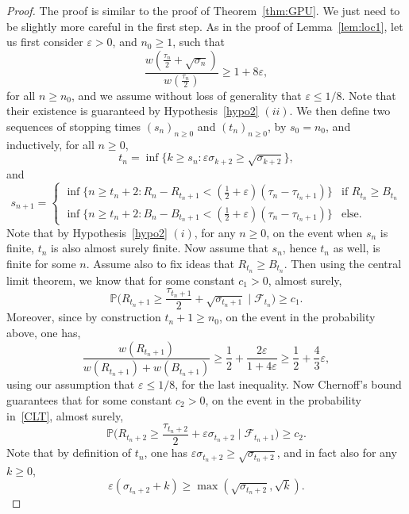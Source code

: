 \documentclass[10pt,a4paper]{amsart}
\newcommand{\1}{{\text{\Large $\mathfrak 1$}}}
\begin{document}
\begin{proof}
The proof is similar to the proof of Theorem~\ref{thm:GPU}. We just need to be slightly more careful in the first step. As in the proof of Lemma~\ref{lem:loc1}, let us first 
consider $\varepsilon>0$, and $n_0\ge 1$, such that 
$$\frac{w( \frac{\tau_n}{2} + \sqrt{\sigma_n})}{w(\frac{\tau_n}{2})} \ge 1+ 8 \varepsilon, $$
for all $n\ge n_0$, and we assume without loss of generality that $\varepsilon\le 1/8$. Note that their existence is guaranteed by Hypothesis~\ref{hypo2} $(ii)$.  We then define two sequences of stopping times $(s_n)_{n\ge 0}$ and 
$(t_n)_{n\ge 0}$, by $s_0 = n_0$, and inductively, for all $n\ge 0$, 
$$t_n = \inf \{ k \ge s_n : \varepsilon\sigma_{k+2} \ge \sqrt{\sigma_{k+2}}\}, $$
and 
\begin{equation*}
s_{n+1} = \left\{ 
\begin{array}{ll} 
\inf \{n \ge t_n +2: R_n - R_{t_n+1} <(\frac 12 + \varepsilon)(\tau_n- \tau_{t_n+1}) \} & \text{if }R_{t_n} \ge B_{t_n} \\
\inf \{n \ge t_n +2: B_n - B_{t_n+1} <(\frac 12 + \varepsilon)(\tau_n- \tau_{t_n+1})\} & \text{else}. 
\end{array}
\right. 
\end{equation*}
Note that by Hypothesis~\ref{hypo2} $(i)$, for any $n\ge 0$, on the event when $s_n$ is finite, $t_n$ is also almost surely finite. 
Now assume that $s_n$, hence $t_n$ as well, is finite for some $n$. Assume also to fix ideas that $R_{t_n} \ge B_{t_n}$. Then using the central limit theorem, we know that for some constant $c_1>0$, almost surely, 
\begin{equation}\label{CLT}
\mathbb P\big(R_{t_n +1} \ge \frac{\tau_{t_n+1}}{2} + \sqrt{\sigma_{t_n +1}} \mid \mathcal F_{t_n}\big)\ge c_1. 
\end{equation}
Moreover, since by construction $t_n+1\ge n_0$, on the event in the probability above, one has, 
$$\frac{w(R_{t_n+1})}{w(R_{t_n+1}) + w(B_{t_n+1})} \ge \frac 12 + \frac{2 \varepsilon}{1+ 4\varepsilon}\ge \frac 12 + \frac 43 \varepsilon,$$
using our assumption that $\varepsilon\le 1/8$, for the last inequality. Now Chernoff's bound guarantees that for some constant $c_2>0$, on the event in the probability in~\eqref{CLT}, almost surely, 
$$ \mathbb P\big(R_{t_n +2} \ge \frac{\tau_{t_n+2}}{2} + \varepsilon \sigma_{t_n+2}  \mid \mathcal F_{t_n+1}\big)\ge c_2.$$  
Note that by definition of $t_n$, one has $\varepsilon \sigma_{t_n+2} \ge \sqrt{\sigma_{t_n+2}}$, and in fact also for any $k\ge 0$, 
$$\varepsilon (\sigma_{t_n+2} + k) \ge \max(\sqrt{\sigma_{t_n+2}},\sqrt{k}). $$  

\end{proof}
\end{document}
